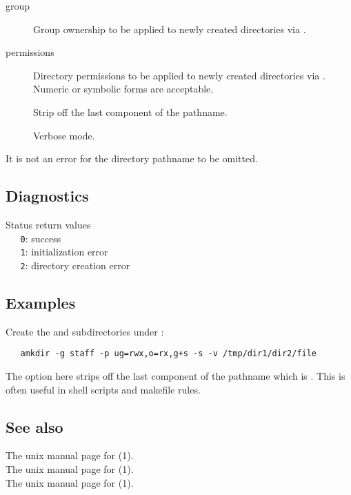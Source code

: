 \begin{description}
\item[ group]
   Group ownership to be applied to newly created directories via
   .

\item[ permissions]
   Directory permissions to be applied to newly created directories via
   .  Numeric or symbolic forms are acceptable.

\item[]
   Strip off the last component of the pathname.

\item[]
   Verbose mode.
\end{description}

\noindent
It is not an error for the directory pathname to be omitted.

\subsection*{Diagnostics}

Status return values
\\ \verb+   0+:  success
\\ \verb+   1+:  initialization error
\\ \verb+   2+:  directory creation error

\subsection*{Examples}

Create the  and  subdirectories under :

\begin{verbatim}
   amkdir -g staff -p ug=rwx,o=rx,g+s -s -v /tmp/dir1/dir2/file
\end{verbatim}

\noindent
The  option here strips off the last component of the pathname which
is .  This is often useful in shell scripts and makefile rules.

\subsection*{See also}

The unix manual page for (1).\\
The unix manual page for (1).\\
The unix manual page for (1).

